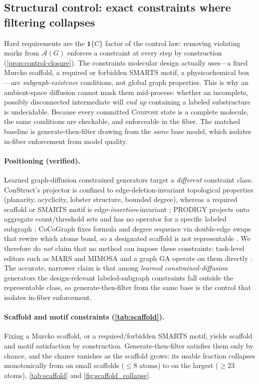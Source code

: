 \documentclass{article}
\newcommand{\method}{\textsc{Compose}\xspace}
\newcommand{\A}{\mathcal{A}}
\newcommand{\one}{\mathbf{1}}
\theoremstyle{definition}
\theoremstyle{remark}
\begin{document}
\subsection{Structural control: exact constraints where filtering collapses}
\label{sec:structural}

Hard requirements are the $\one\{C\}$ factor of the control law: removing violating marks from $\A(G)$ enforces a constraint at every step by construction (\cref{prop:control-closure}). The constraints molecular design actually uses---a fixed Murcko scaffold, a required or forbidden SMARTS motif, a physicochemical box---are \emph{subgraph-existence} conditions, not global graph properties. This is why an ambient-space diffusion cannot mask them mid-process: whether an incomplete, possibly disconnected intermediate will \emph{end up} containing a labeled substructure is undecidable. Because every committed \method state is a complete molecule, the same conditions are checkable, and enforceable in the fiber. The matched baseline is generate-then-filter drawing from the \emph{same} base model, which isolates in-fiber enforcement from model quality.

\paragraph{Positioning (verified).}
Learned graph-diffusion constrained generators target a \emph{different} constraint class. ConStruct's projector is confined to edge-deletion-invariant topological properties (planarity, acyclicity, lobster structure, bounded degree), whereas a required scaffold or SMARTS motif is edge-\emph{insertion}-invariant \citep{madeira2024construct}; PRODIGY projects onto aggregate count/threshold sets and has no operator for a specific labeled subgraph \citep{sharma2024prodigy}; CoCoGraph fixes formula and degree sequence via double-edge swaps that rewire which atoms bond, so a designated scaffold is not representable \citep{ruizbotella2026cocograph}. We therefore do \emph{not} claim that no method can impose these constraints: task-level editors such as MARS and MIMOSA and a graph GA operate on them directly \citep{xie2021mars,fu2021mimosa,jensen2019graphga}. The accurate, narrower claim is that among \emph{learned constrained-diffusion} generators the design-relevant labeled-subgraph constraints fall outside the representable class, so generate-then-filter from the same base is the control that isolates in-fiber enforcement.

\paragraph{Scaffold and motif constraints (\cref{tab:scaffold}).}
Fixing a Murcko scaffold, or a required/forbidden SMARTS motif, yields \ComposeScaffoldSatisfaction{} scaffold and \ComposeSubstructureSatisfaction{} motif satisfaction by construction. Generate-then-filter satisfies them only by chance, and the chance vanishes as the scaffold grows: its usable fraction collapses monotonically from \ComposeBaselineScaffoldEasy{} on small scaffolds ($\le 8$ atoms) to \ComposeBaselineScaffoldHard{} on the largest ($\ge 23$ atoms), \cref{tab:scaffold} and \cref{fig:scaffold_collapse}.
\end{document}
